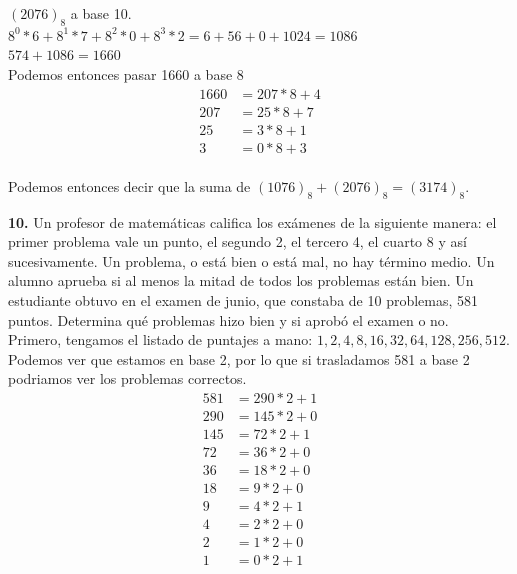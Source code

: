 \documentclass[12pt]{article}
\begin{document}
\begin{enumerate}[label=\alph*)]
        $(2076)_8$ a base 10.\\
        $8^0 \ast 6 + 8^1 \ast 7 + 8^2 \ast 0 + 8^3 \ast 2 = 6 + 56 + 0 + 1024 = 1086$\\

        $574 + 1086 = 1660$\\

        Podemos entonces pasar 1660 a base 8\\
        \begin{align*}
            1660 &= 207 \ast 8 + 4\\
            207 &= 25 \ast 8 + 7\\
            25 &= 3 \ast 8 + 1\\
            3 &= 0 \ast 8 + 3\\
        \end{align*}

        Podemos entonces decir que la suma de $(1076)_8 + (2076)_8 = (3174)_8$.
\end{enumerate}

\vspace{1cm}

%
%
\textbf{10.} Un profesor de matemáticas califica los exámenes de la siguiente manera: el primer problema vale un
punto, el segundo 2, el tercero 4, el cuarto 8 y así sucesivamente. Un problema, o está bien o está mal, no hay
término medio. Un alumno aprueba si al menos la mitad de todos los problemas están bien. Un estudiante
obtuvo en el examen de junio, que constaba de 10 problemas, 581 puntos. Determina qué problemas hizo bien
y si aprobó el examen o no.\\

Primero, tengamos el listado de puntajes a mano: $1, 2, 4, 8, 16, 32, 64, 128, 256, 512$.\\

Podemos ver que estamos en base 2, por lo que si trasladamos 581 a base 2 podriamos ver los problemas correctos.
\begin{align*}
    581 &= 290 \ast 2 + 1\\
    290 &= 145 \ast 2 + 0\\
    145 &= 72 \ast 2 + 1\\
    72 &= 36 \ast 2 + 0\\
    36 &= 18 \ast 2 + 0\\
    18 &= 9 \ast 2 + 0\\
    9 &= 4 \ast 2 + 1\\
    4 &= 2 \ast 2 + 0\\
    2 &= 1 \ast 2 + 0\\
    1 &= 0 \ast 2 + 1\\
\end{align*}
\end{document}
